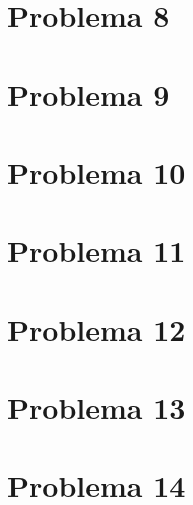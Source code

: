 \color{black}
	



	\section{Problema 8}
\color{blue}

\color{black}
	



	\section{Problema 9}
\color{blue}

\color{black}
	



	\section{Problema 10}
\color{blue}

\color{black}
	



	\section{Problema 11}
\color{blue}

\color{black}
	



	\section{Problema 12}
\color{blue}

\color{black}
	



	\section{Problema 13}
\color{blue}

\color{black}
	



	\section{Problema 14}
\color{blue}

\color{black}
	


